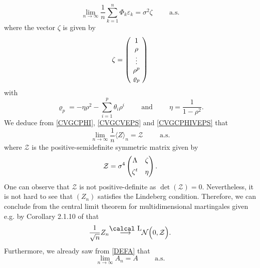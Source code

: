 \documentclass[article,12pt]{amsart}
\numberwithin{equation}{section}
\theoremstyle{plain}
\begin{document}
\begin{equation}
\label{CVGCPHIVEPS}
\lim_{n\rightarrow \infty} \frac{1}{n} \sum_{k=1}^{n} \Phi_{k}{\varepsilon}_{k} 
 =  \sigma^2 \zeta
\hspace{1cm} \text{a.s.}
\end{equation}
where the vector $\zeta$ is given by
\begin{equation}
\label{DEFZETA}
\zeta
 =
\begin{pmatrix}
\ 1  \ \\ 
\ \rho  \ \\ 
\ \vdots  \ \\  
\ \rho^{p} \ \\
\  \varrho_p \
\end{pmatrix}
\vspace{1ex}
\end{equation}
with
$$
\varrho_p= - \eta \rho^2 - \sum_{i=1}^p \theta_{i} \rho^{i}
\hspace{1cm} \text{and} \hspace{1cm} 
\eta = \frac{1}{1- \rho^2}.
$$
We deduce from \eqref{CVGCPHI}, \eqref{CVGCVEPS} and \eqref{CVGCPHIVEPS} that
\begin{equation}
\label{CVGIPZN}
\lim_{n\rightarrow \infty} \frac{1}{n} \langle Z \rangle_n= {\mathcal{Z}}
\hspace{1cm}\text{a.s.}
\end{equation}
where ${\mathcal{Z}}$ is the positive-semidefinite symmetric matrix given by
\begin{equation}
\label{DEFCALL}
{\mathcal{Z}}=\sigma^4
\begin{pmatrix}
\Lambda & \zeta  \vspace{1ex}\\
\zeta^{t}  & \eta
\end{pmatrix}.
\end{equation}
One can observe that ${\mathcal{Z}}$ is not positive-definite as $\det({\mathcal{Z}})=0$. Nevertheless,
it is not hard to see that $(Z_n)$ satisfies the Lindeberg condition.
Therefore, we can conclude from the central limit theorem for multidimensional martingales 
given e.g. by Corollary 2.1.10 of \cite{Duflo} that
\begin{equation}
\label{CLTZN}
\frac{1}{\sqrt{n}} Z_{n} {{\mathrel{\mathop{\kern 0pt{\longrightarrow}}\limits_{{}}^{{{\mbox{\calcal L}}}}}}} {\mathcal{N}} \Bigl(0, {\mathcal{Z}} \Bigr).
\end{equation}
Furthermore, we already saw from \eqref{DEFA} that
\begin{equation*}
\lim_{n\rightarrow \infty} A_{n} 
 =  A
\hspace{1cm} \text{a.s.}
\end{equation*}
\end{document}
